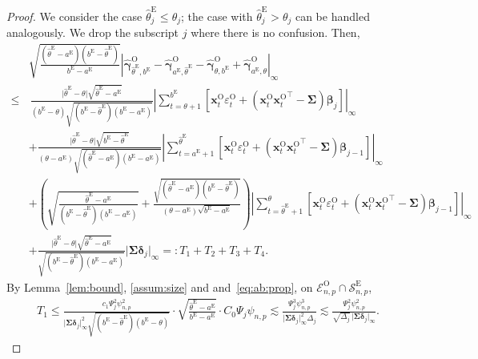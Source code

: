 \documentclass[11pt, a4paper]{article}
\newcommand{\mbf}{\mathbf}
\newcommand{\mc}{\mathcal}
\newcommand{\vep}{\varepsilon}
\renewcommand{\l}{\left}
\renewcommand{\r}{\right}
\def\wh{\widehat}
\newcommand{\cp}{\theta}
\newcommand{\tE}{\text{E}}
\newcommand{\tO}{\text{O}}
\theoremstyle{definition}
\theoremstyle{definition}
\theoremstyle{definition}
\theoremstyle{definition}
\theoremstyle{definition}
\theoremstyle{remark}
\theoremstyle{definition}
\theoremstyle{definition}
\theoremstyle{definition}
\begin{document}
\begin{proof} We consider the case $\wh\cp^{\tE}_j \le \cp_j$; the case with $\wh\cp^{\tE}_j > \cp_j$ can be handled analogously. 
	We drop the subscript $j$ where there is no confusion. 
	Then,
	\begin{align*}
	& \sqrt{\frac{(\wh\cp^{\tE} - a^{\tE})(b^{\tE} - \wh\cp^{\tE})}{b^{\tE} - a^{\tE}}} 
	\l\vert \wh{\bm\gamma}^{\tO}_{\wh\cp^{\tE}, b^{\tE}} - \wh{\bm\gamma}^{\tO}_{a^{\tE}, \wh\cp^{\tE}} - \wh{\bm\gamma}^{\tO}_{\cp, b^{\tE}} + \wh{\bm\gamma}^{\tO}_{a^{\tE}, \cp} \r\vert_\infty
	\\
	\le & \,
	\frac{\vert \wh\cp^{\tE} - \cp \vert \sqrt{\wh\cp^{\tE} - a^{\tE}}}{(b^{\tE} - \cp)\sqrt{(b^{\tE} - \wh\cp^{\tE})(b^{\tE} - a^{\tE})}} 
	\l\vert \sum_{t = \cp + 1}^{b^{\tE}} \l[ \mbf x_t^{\tO} \vep_t^{\tO} + \l(\mbf x_t^{\tO}{\mbf x_t^{\tO}}^\top - \bm\Sigma\r) \bm\beta_j \r] \r\vert_\infty
	\\
	& + \frac{\vert \wh\cp^{\tE} - \cp \vert \sqrt{ b^{\tE} - \wh\cp^{\tE} }}{(\cp - a^{\tE})\sqrt{(\wh\cp^{\tE} - a^{\tE})(b^{\tE} - a^{\tE})}} 
	\l\vert \sum_{t = a^{\tE} + 1}^{\wh\cp^{\tE}} \l[ \mbf x_t^{\tO} \vep_t^{\tO} + \l(\mbf x_t^{\tO}{\mbf x_t^{\tO}}^\top - \bm\Sigma\r) \bm\beta_{j - 1} \r] \r\vert_\infty
	\\
	& + \l( \sqrt{\frac{\wh\cp^{\tE} - a^{\tE}}{(b^{\tE} - \wh\cp^{\tE})(b^{\tE} - a^{\tE})}} + \frac{\sqrt{(\wh\cp^{\tE} - a^{\tE}) (b^{\tE} - \wh\cp^{\tE})}}{(\cp - a^{\tE})\sqrt{ b^{\tE} - a^{\tE}}} \r) 	\l\vert \sum_{t = \wh\cp^{\tE} + 1}^{\cp} \l[ \mbf x_t^{\tO} \vep_t^{\tO} + \l(\mbf x_t^{\tO}{\mbf x_t^{\tO}}^\top - \bm\Sigma\r) \bm\beta_{j - 1} \r] \r\vert_\infty 
	\\
	& + \frac{\vert \wh\cp^{\tE} - \cp \vert\sqrt{\wh\cp^{\tE} - a^{\tE}}}{\sqrt{(b^{\tE} - \wh\cp^{\tE})(b^{\tE} - a^{\tE})}} 
	\vert \bm\Sigma \bm\delta_j \vert_\infty
	=: T_1 + T_2 + T_3 + T_4.
	\end{align*}
	By Lemma~\ref{lem:bound}, \cref{assum:size} and and~\eqref{eq:ab:prop}, on $\mc E^{\tO}_{n, p} \cap \mc S^{\tE}_{n, p}$,
	\begin{align*}
	T_1 \le \frac{c_1 \Psi_j^2 \psi_{n, p}^2}{\vert \bm\Sigma \bm\delta_j \vert_\infty^2 \sqrt{(b^{\tE} - \wh\cp^{\tE})(b^{\tE} - \cp)}} \cdot \sqrt{\frac{\wh\cp^{\tE} - a^{\tE}}{b^{\tE} - a^{\tE}}} \cdot C_0 \Psi_j \psi_{n, p}
	\lesssim \frac{\Psi_j^3 \psi_{n, p}^3}{\vert \bm\Sigma \bm\delta_j \vert_\infty^2 \Delta_j}
	\lesssim \frac{\Psi_j^2 \psi_{n, p}^2}{\sqrt{\Delta_j} \,\vert \bm\Sigma \bm\delta_j \vert_\infty}. 
	\end{align*}

\end{proof}
\end{document}
